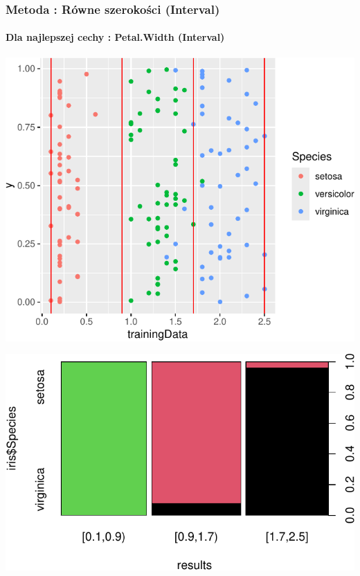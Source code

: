 \documentclass[
  12pt,
]{article}
\begin{document}
\subsubsection{Metoda : Równe szerokości
(Interval)}\label{metoda-ruxf3wne-szerokoux15bci-interval}

\paragraph{Dla najlepszej cechy : Petal.Width
(Interval)}\label{dla-najlepszej-cechy-petal.width-interval}

\begin{center}\includegraphics{Sprawozdanie2_files/figure-latex/width_najl-1} \end{center}

\begin{center}\includegraphics{Sprawozdanie2_files/figure-latex/tabela_kondygnacji_2_najl-1} \end{center}
\end{document}
